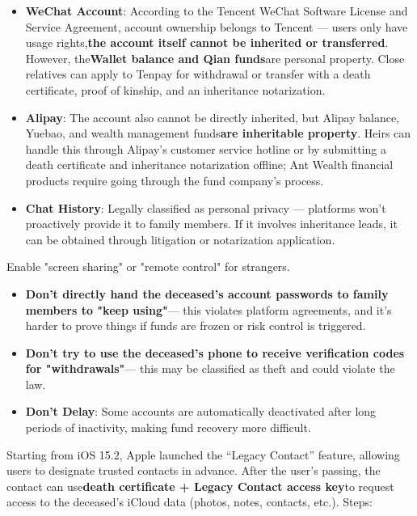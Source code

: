 \begin{itemize}
  \item \textbf{WeChat Account}: According to the Tencent WeChat Software License and Service Agreement, account ownership belongs to Tencent — users only have usage rights,\textbf{the account itself cannot be inherited or transferred}. However, the\textbf{Wallet balance and Qian funds}are personal property. Close relatives can apply to Tenpay for withdrawal or transfer with a death certificate, proof of kinship, and an inheritance notarization.
  \item \textbf{Alipay}: The account also cannot be directly inherited, but Alipay balance, Yuebao, and wealth management funds\textbf{are inheritable property}. Heirs can handle this through Alipay's customer service hotline or by submitting a death certificate and inheritance notarization offline; Ant Wealth financial products require going through the fund company's process.
  \item \textbf{Chat History}: Legally classified as personal privacy — platforms won't proactively provide it to family members. If it involves inheritance leads, it can be obtained through litigation or notarization application.
\end{itemize}

\begin{tcbwarn}{Enable "screen sharing" or "remote control" for strangers.}
\begin{itemize}
  \item \textbf{Don't directly hand the deceased's account passwords to family members to "keep using"}— this violates platform agreements, and it's harder to prove things if funds are frozen or risk control is triggered.
  \item \textbf{Don't try to use the deceased's phone to receive verification codes for "withdrawals"}— this may be classified as theft and could violate the law.
  \item \textbf{Don't Delay}: Some accounts are automatically deactivated after long periods of inactivity, making fund recovery more difficult.
\end{itemize}

\end{tcbwarn}


Starting from iOS 15.2, Apple launched the “Legacy Contact” feature, allowing users to designate trusted contacts in advance. After the user's passing, the contact can use\textbf{death certificate + Legacy Contact access key}to request access to the deceased's iCloud data (photos, notes, contacts, etc.). Steps:

